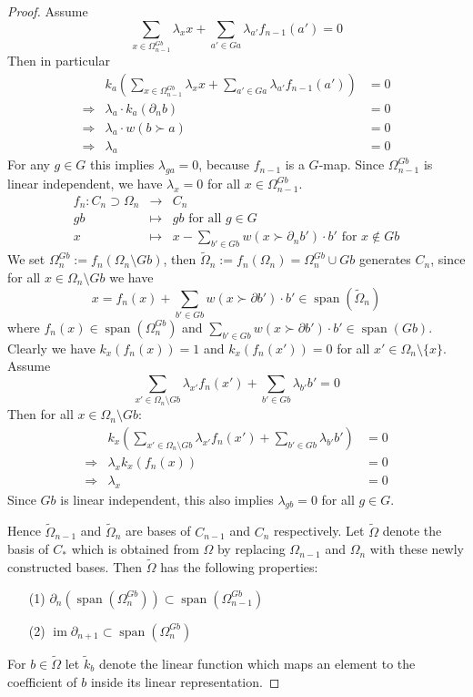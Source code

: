 \documentclass{elsarticle}
\def\im{\operatorname{im}}
\def\span{\operatorname{span}}
\begin{document}
\begin{proof}
Assume
\[
\sum_{x\in\Omega^{Gb}_{n-1}}\lambda_xx+\sum_{a'\in Ga}\lambda_{a'}f_{n-1}(a')=0
\]
Then in particular
\begin{eqnarray*}
&k_a\left(\sum_{x\in\Omega^{Gb}_{n-1}}\lambda_xx+\sum_{a'\in Ga}\lambda_{a'}f_{n-1}(a')\right)&=0\\
\Longrightarrow&\lambda_a\cdot k_a(\partial_n b)&=0\\
\Longrightarrow&\lambda_a\cdot w(b\succ a)&=0\\
\Longrightarrow&\lambda_a&=0
\end{eqnarray*}
For any $g\in G$ this implies $\lambda_{ga}=0$, because $f_{n-1}$ is a $G$-map. Since $\Omega^{Gb}_{n-1}$ is linear independent, we have $\lambda_x=0$ for all $x\in\Omega^{Gb}_{n-1}$.
\begin{eqnarray*}
f_n:C_n\supset\Omega_n&\longrightarrow&C_n\\
gb&\longmapsto&gb\text{ for all $g\in G$}\\
x&\longmapsto&x-\sum_{b'\in Gb}w(x\succ\partial_n b')\cdot b'\text{ for $x\not\in Gb$}
\end{eqnarray*}
We set $\Omega_n^{Gb}:=f_n(\Omega_n\setminus Gb)$, then $\widetilde\Omega_n:=f_n(\Omega_n)=\Omega_n^{Gb}\cup Gb$ generates $C_n$, since for all $x\in\Omega_n\setminus Gb$ we have
\[
x=f_n(x)+\sum_{b'\in Gb}w(x\succ\partial b')\cdot b'\in\span(\widetilde\Omega_n)
\]
where $f_n(x)\in\span(\Omega_n^{Gb})$ and $\sum_{b'\in Gb}w(x\succ\partial b')\cdot b'\in\span(Gb)$. Clearly we have $k_x(f_n(x))=1$ and $k_x(f_n(x'))=0$ for all $x'\in\Omega_n\setminus\{x\}$. Assume
\[
\sum_{x'\in\Omega_n\setminus Gb}\lambda_{x'} f_n(x')+\sum_{b'\in Gb}\lambda_{b'}b'=0
\]
Then for all $x\in\Omega_n\setminus Gb$:
\begin{eqnarray*}
&k_x\left(\sum_{x'\in\Omega_n\setminus Gb}\lambda_{x'} f_n(x')+\sum_{b'\in Gb}\lambda_{b'}b'\right)&=0\\
\Longrightarrow&\lambda_xk_x(f_n(x))&=0\\
\Longrightarrow&\lambda_x&=0
\end{eqnarray*}
Since $Gb$ is linear independent, this also implies $\lambda_{gb}=0$ for all $g\in G$.

Hence $\widetilde\Omega_{n-1}$ and $\widetilde\Omega_n$ are bases of $C_{n-1}$ and $C_n$ respectively. Let $\widetilde\Omega$ denote the basis of $C_*$ which is obtained from $\Omega$ by replacing $\Omega_{n-1}$ and $\Omega_n$ with these newly constructed bases. Then $\widetilde\Omega$ has the following properties:
\begin{itemize}
 \item[(1)] $\partial_n(\span(\Omega_n^{Gb}))\subset\span(\Omega_{n-1}^{Gb})$
 \item[(2)] $\im\partial_{n+1}\subset\span(\Omega_n^{Gb})$
\end{itemize}
For $b\in\widetilde\Omega$ let $\widetilde k_b$ denote the linear function which maps an element to the coefficient of $b$ inside its linear representation.


\end{proof}
\end{document}
